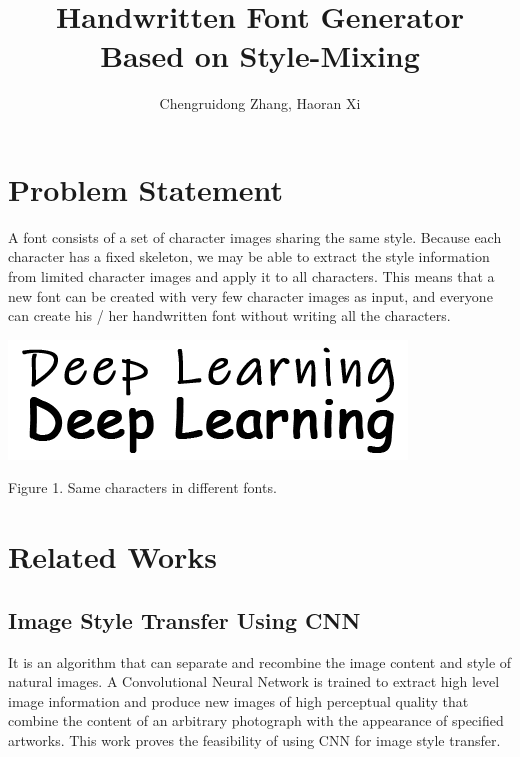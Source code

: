 \documentclass[letterpaper]{article}
\begin{document}
%
\title{Handwritten Font Generator \\ Based on Style-Mixing}
\author{Chengruidong Zhang, Haoran Xi}
\maketitle

\section{Problem Statement}
A font consists of a set of character images sharing the same style. Because each character has a fixed skeleton, we may be able to extract the style information from limited character images and apply it to all characters. This means that a new font can be created with very few character images as input, and everyone can create his / her handwritten font without writing all the characters.

\begin{center}
    \includegraphics[]{update-fig-sample.png}

    Figure 1. Same characters in different fonts.
\end{center}


\section{Related Works}
\subsection{Image Style Transfer Using CNN}
It is an algorithm that can separate and recombine the image content and style of natural images. A Convolutional Neural Network is trained to extract high level image information and produce new images of high perceptual quality that combine the content of an arbitrary photograph with the appearance of specified artworks. This work proves the feasibility of using CNN for image style transfer.
\end{document}
